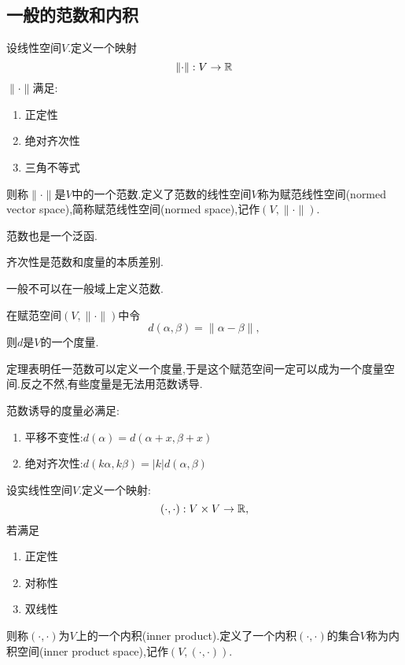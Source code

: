 \subsection{一般的范数和内积}

\begin{axiom}
    [范数]%
    设线性空间$V$.定义一个映射
    \[\lVert \cdot\rVert:V\to\mathbb{R}\]
    $\lVert \cdot\rVert$满足:
    \begin{enumerate}
        \item 正定性
        \item 绝对齐次性
        \item 三角不等式
    \end{enumerate}则称$\lVert \cdot\rVert$是$V$中的一个范数.定义了范数的线性空间$V$称为赋范线性空间(normed vector space),简称赋范线性空间(normed space),记作$(V,\lVert\cdot\rVert)$.
\end{axiom}

\begin{remark}
    范数也是一个泛函.
\end{remark}

\begin{remark}
    齐次性是范数和度量的本质差别.
\end{remark}

\begin{note}
    一般不可以在一般域上定义范数.
\end{note}


\begin{theorem}
    [范数诱导的度量]
    在赋范空间$(V,\lVert\cdot\rVert)$中令
    \[d(\alpha,\beta)=\lVert\alpha -\beta\rVert,\]
    则$d$是$V$的一个度量.
\end{theorem}

\begin{remark}
    定理表明任一范数可以定义一个度量,于是这个赋范空间一定可以成为一个度量空间.反之不然,有些度量是无法用范数诱导.
\end{remark}

\begin{remark}
    范数诱导的度量必满足:
    \begin{enumerate}
        \item 平移不变性:$d(\alpha)=d(\alpha+x,\beta+x)$
        \item 绝对齐次性:$d(k\alpha,k\beta)=|k|d(\alpha,\beta)$
    \end{enumerate}
\end{remark}

\begin{axiom}
    [内积]%
    设实线性空间$V$.定义一个映射:
    \[(\cdot,\cdot):V\times V\to\mathbb{R},\]
    若满足
    \begin{enumerate}
        \item 正定性
        \item 对称性
        \item 双线性
    \end{enumerate}
    则称$(\cdot,\cdot)$为$V$上的一个内积(inner product).定义了一个内积$(\cdot,\cdot)$的集合$V$称为内积空间(inner product space),记作$(V,(\cdot,\cdot))$.
\end{axiom}

